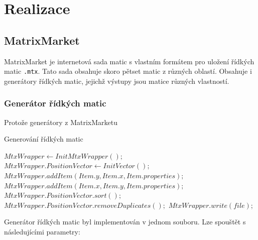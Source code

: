 \chapter{Realizace}

\section{MatrixMarket}

MatrixMarket \cite{Boisvert:1997:MMW:265834.265854} je internetová sada matic s vlastním formátem pro uložení řídkých matic \texttt{.mtx}. Tato sada obsahuje skoro pětset matic z různých oblastí. Obsahuje i generátory řídkých matic, jejichž výstupy jsou matice různých vlastností.

\subsection{Generátor řídkých matic}

Protože generátory z MatrixMarketu 

\begin{algorithm}[H]
	\caption{Generování řídkých matic}\label{mmm-recursive}
	\begin{algorithmic}[1]
		\State \texttt{$MtxWrapper \gets InitMtxWrapper();$}
		\State \texttt{$MtxWrapper.PositionVector \gets InitVector();$}	
			\State \texttt{$MtxWrapper.addItem(Item.y, Item.x, Item.properties);$}
				\State \texttt{$MtxWrapper.addItem(Item.x, Item.y, Item.properties);$}
			\EndIf
		\EndFor
		\State \texttt{$MtxWrapper.PositionVector.sort();$}
		\State \texttt{$MtxWrapper.PositionVector.removeDuplicates();$}
		\State \texttt{$MtxWrapper.write(file);$}
		\EndProcedure
	\end{algorithmic}
\end{algorithm}

Generátor řídkých matic byl implementován v jednom souboru. Lze spouštět s následujícími parametry:

